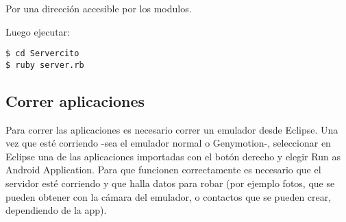 Por una direcci\'on accesible por los modulos.

Luego ejecutar:

\begin{verbatim}
$ cd Servercito
$ ruby server.rb 
\end{verbatim}


	
	\subsection{Correr aplicaciones}
		Para correr las aplicaciones es necesario correr un emulador desde Eclipse. Una vez que esté corriendo -sea el emulador normal o Genymotion-, seleccionar en Eclipse una de las aplicaciones importadas con el botón derecho y elegir Run as Android Application. Para que funcionen correctamente es necesario que el servidor esté corriendo y que halla datos para robar (por ejemplo fotos, que se pueden obtener con la cámara del emulador, o contactos que se pueden crear, dependiendo de la app).
